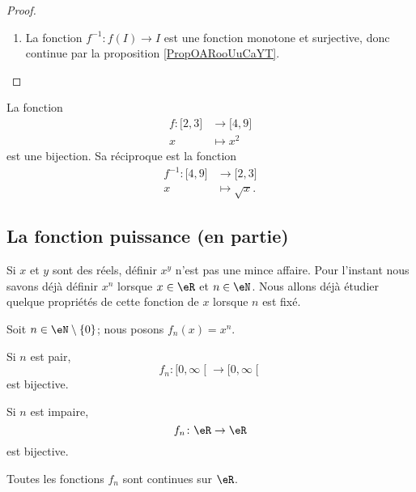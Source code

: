 \begin{proof}
\begin{enumerate}
\item

    La fonction \( f^{-1}\colon f(I)\to I\) est une fonction monotone et surjective, donc continue par la proposition \ref{PropOARooUuCaYT}.
  
    \end{enumerate}
\end{proof}

\begin{example}
    La fonction
    \begin{equation}
        \begin{aligned}
            f\colon \mathopen[ 2 , 3 \mathclose]&\to \mathopen[ 4 , 9 \mathclose] \\
            x&\mapsto x^2 
        \end{aligned}
    \end{equation}
    est une bijection. Sa réciproque est la fonction
    \begin{equation}
        \begin{aligned}
            f^{-1}\colon \mathopen[ 4 , 9 \mathclose]&\to \mathopen[ 2 , 3 \mathclose] \\
            x&\mapsto \sqrt{x}. 
        \end{aligned}
    \end{equation}
\end{example}



\subsection{La fonction puissance (en partie)}

Si \( x\) et \( y\) sont des réels, définir \( x^y\) n'est pas une mince affaire. Pour l'instant nous savons déjà définir \( x^n\) lorsque \( x\in \eR\) et \( n\in \eN\). Nous allons déjà étudier quelque propriétés de cette fonction de \( x\) lorsque \( n\) est fixé.

\begin{proposition}     \label{PROPooXQYFooPxoEHE}
    Soit \( n\in \eN\setminus\{ 0 \}\); nous posons \( f_n(x)=x^n\). 
    
    Si \( n\) est pair,
    \begin{equation}
        f_n\colon \mathopen[ 0 , \infty \mathclose[\to \mathopen[ 0 , \infty \mathclose[
    \end{equation}
    est bijective.

    Si \( n\) est impaire,
    \begin{equation}
        f_n\colon \eR \to \eR
    \end{equation}
    est bijective.

    Toutes les fonctions \( f_n\) sont continues sur \( \eR\).
\end{proposition}

